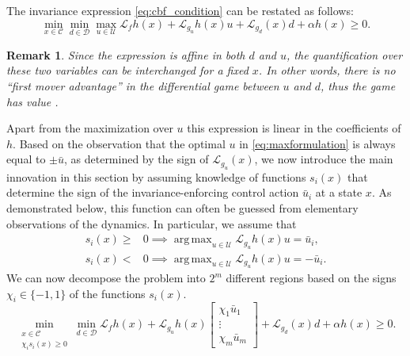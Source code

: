 \documentclass[conference]{IEEEtran}
\newtheorem{remark}{Remark}
\DeclareMathOperator*{\argmax}{arg\,max}
\begin{document}
The invariance expression \eqref{eq:cbf_condition} can be restated as follows:
\begin{equation}
\label{eq:maxformulation}
  \min_{x \in \mathcal C} \min_{d \in \mathcal D} \max_{u \in \mathcal U} \mathcal L_f h(x) + \mathcal L_{g_u} h(x) u + \mathcal L_{g_d}(x) d + \alpha h(x) \geq 0.
\end{equation}
\begin{remark}
  Since the expression is affine in both $d$ and $u$, the quantification over these two variables can be interchanged for a fixed $x$. In other words, there is no ``first mover advantage'' in the differential game between $u$ and $d$, thus the game \emph{has value} \cite{Barron1990}.
\end{remark}
Apart from the maximization over $u$ this expression is linear in the coefficients of $h$. Based on the observation that the optimal $u$ in \eqref{eq:maxformulation} is always equal to $\pm \bar u$, as determined by the sign of $\mathcal L_{g_u}(x)$, we now introduce the main innovation in this section by assuming knowledge of functions $s_i(x)$ that determine the sign of the invariance-enforcing control action $\bar u_i$ at a state $x$. As demonstrated below, this function can often be guessed from elementary observations of the dynamics. In particular, we assume that
\begin{equation}
\label{eq:signfunction}
\begin{aligned}
	s_i(x) \geq &0 \implies \argmax_{u \in \mathcal U} \mathcal L_{g_u} h(x) u = \bar u_i, \\
	s_i(x) < &0 \implies \argmax_{u \in \mathcal U} \mathcal L_{g_u} h(x) u = -\bar u_i.
\end{aligned}
\end{equation}
We can now decompose the problem into $2^m$ different regions based on the signs $\chi_i \in \{ -1,1 \}$ of the functions $s_i(x)$.
\begin{equation}
  \min_{\substack{x \in  \mathcal C \\ \chi_i s_i(x) \geq 0}} \min_{d \in \mathcal D} \mathcal L_f h(x) + \mathcal L_{g_u} h(x) \begin{bmatrix}
  	\chi_1 \bar u_1 \\
  	\vdots \\
  	\chi_m \bar u_m
  \end{bmatrix} + \mathcal L_{g_d}(x) d + \alpha h(x) \geq 0.
\end{equation}
\end{document}
